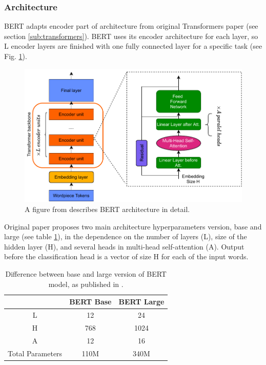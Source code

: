 \subsubsection{Architecture}
BERT adapts encoder part of architecture from original Transformers paper   \citep{Vaswani2017} (see section \ref{sub:transformers}).
BERT uses its encoder architecture for each layer, so L encoder layers are finished with one fully connected layer for a specific task (see Fig. \ref{pic:bert_arch}).

\begin{figure}[H]
\centering
\includegraphics[width=0.8\columnwidth]{../img/bert_arch}
\caption{A figure from \citep{Ganesh2020} describes BERT architecture in detail.}
\label{pic:bert_arch}
\end{figure}

 Original paper proposes two main architecture hyperparameters version, base and large (see table \ref{Tab:base_large}), in the dependence on the number of layers (L), size of the hidden layer (H), and several heads in multi-head self-attention (A). Output before the classification head is a vector of size H for each of the input words. 

\begin{table}
\centering
\begin{tabular}{ |c|c|c| } 
 \hline
    & BERT Base &BERT Large \\ 
 \hline \hline
 L & 12 & 24 \\ \hline
 H & 768 & 1024 \\ \hline
  A & 12 & 16\\ \hline
Total Parameters & 110M & 340M \\\hline
\end{tabular}
\caption{Difference between base and large version of BERT model, as published in 
\citep{Devlin2019}.
} 
\label{Tab:base_large}
\end{table}

